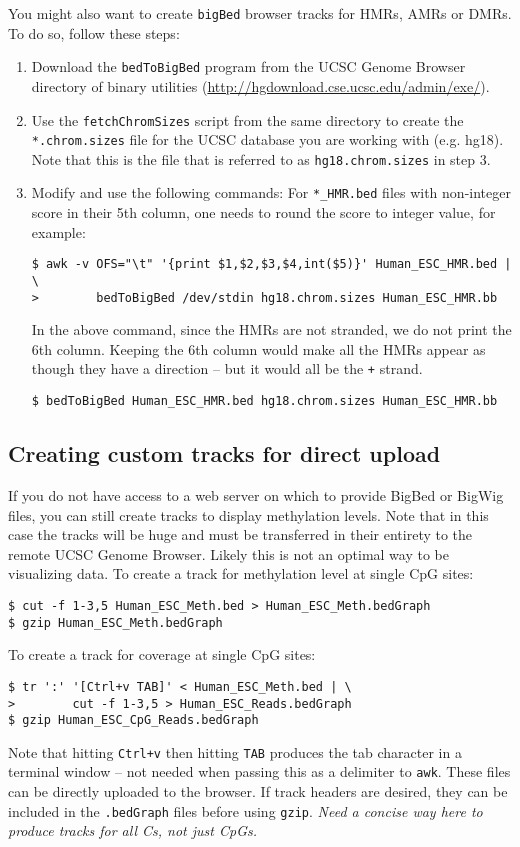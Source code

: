 \documentclass[10pt]{article}
\newcommand{\prog}[1]{\texttt{#1}}
\newcommand{\fn}[1]{\texttt{#1}}
\newcommand{\lit}[1]{\texttt{#1}}
\begin{document}
\noindent
You might also want to create \fn{bigBed} browser tracks for HMRs,
AMRs or DMRs. To do so, follow these steps:
\begin{enumerate}
\item Download the \prog{bedToBigBed} program from the UCSC Genome
  Browser directory of binary utilities
  (\url{http://hgdownload.cse.ucsc.edu/admin/exe/}).
\item Use the \fn{fetchChromSizes} script from the same directory to
  create the \fn{*.chrom.sizes} file for the UCSC database you are
  working with (e.g. hg18). Note that this is the file that is
  referred to as \fn{hg18.chrom.sizes} in step 3.
\item Modify and use the following commands: For \fn{*\_HMR.bed} files
  with non-integer score in their 5th column, one needs to round the
  score to integer value, for example:
\begin{verbatim}
$ awk -v OFS="\t" '{print $1,$2,$3,$4,int($5)}' Human_ESC_HMR.bed | \
>        bedToBigBed /dev/stdin hg18.chrom.sizes Human_ESC_HMR.bb
\end{verbatim}
  In the above command, since the HMRs are not stranded, we do not
  print the 6th column. Keeping the 6th column would make all the HMRs
  appear as though they have a direction -- but it would all be the
  \lit{+} strand.
\begin{verbatim}
$ bedToBigBed Human_ESC_HMR.bed hg18.chrom.sizes Human_ESC_HMR.bb
\end{verbatim}
\end{enumerate}

\subsection{Creating custom tracks for direct upload}

If you do not have access to a web server on which to provide BigBed
or BigWig files, you can still create tracks to display methylation
levels. Note that in this case the tracks will be huge and must be
transferred in their entirety to the remote UCSC Genome
Browser. Likely this is not an optimal way to be visualizing data.  To
create a track for methylation level at single CpG sites:
\begin{verbatim}
$ cut -f 1-3,5 Human_ESC_Meth.bed > Human_ESC_Meth.bedGraph
$ gzip Human_ESC_Meth.bedGraph
\end{verbatim}
To create a track for coverage at single CpG sites:
\begin{verbatim}
$ tr ':' '[Ctrl+v TAB]' < Human_ESC_Meth.bed | \
>        cut -f 1-3,5 > Human_ESC_Reads.bedGraph
$ gzip Human_ESC_CpG_Reads.bedGraph
\end{verbatim}
Note that hitting \lit{Ctrl+v} then hitting \lit{TAB} produces the tab
character in a terminal window -- not needed when passing this as a
delimiter to \prog{awk}. These files can be directly uploaded to the
browser. If track headers are desired, they can be included in the
\fn{.bedGraph} files before using \prog{gzip}.  {\em Need a concise
  way here to produce tracks for all Cs, not just CpGs.}
\end{document}
